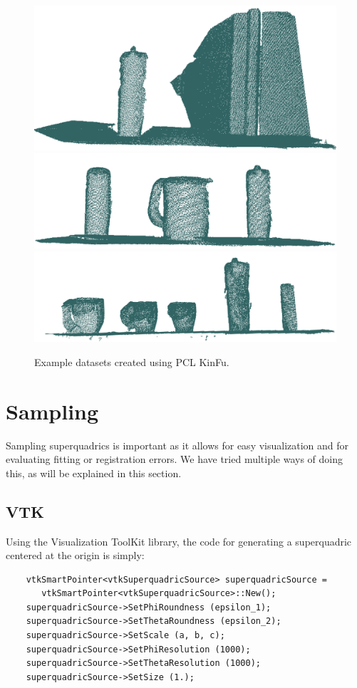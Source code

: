 \documentclass{article}
\begin{document}
\begin{figure}
\centering
\includegraphics[width=0.3\columnwidth]{figures/kinfu_1}
\includegraphics[width=0.3\columnwidth]{figures/kinfu_2}
\includegraphics[width=0.3\columnwidth]{figures/kinfu_3}
\caption {Example datasets created using PCL KinFu.}
\label{fig:kinfu_datasets}
\end{figure}
		
		
		
	


\section {Sampling}
\label{sec:sampling}

Sampling superquadrics is important as it allows for easy visualization and for evaluating fitting or registration errors. We have tried multiple ways of doing this, as will be explained in this section.

\subsection {VTK}

Using the Visualization ToolKit library, the code for generating a superquadric centered at the origin is simply:

\begin{verbatim}
    vtkSmartPointer<vtkSuperquadricSource> superquadricSource = 
       vtkSmartPointer<vtkSuperquadricSource>::New();
    superquadricSource->SetPhiRoundness (epsilon_1);
    superquadricSource->SetThetaRoundness (epsilon_2);
    superquadricSource->SetScale (a, b, c);
    superquadricSource->SetPhiResolution (1000);
    superquadricSource->SetThetaResolution (1000);
    superquadricSource->SetSize (1.);
\end{verbatim}
\end{document}
